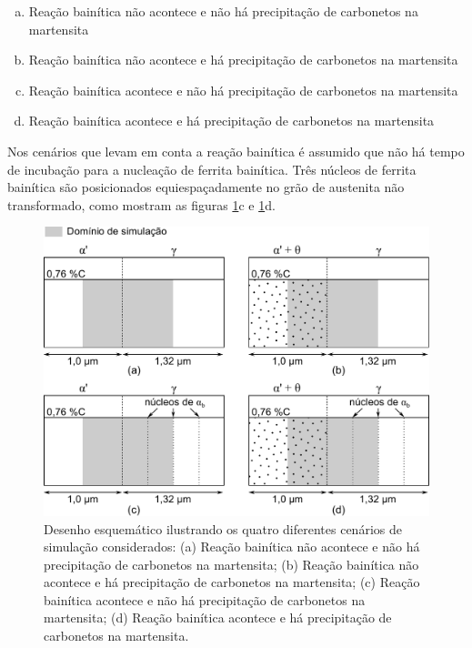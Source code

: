 \begin{enumerate}[(a)]
  \item Reação bainítica não acontece e não há precipitação de carbonetos na martensita
  \item Reação bainítica não acontece e há precipitação de carbonetos na martensita
  \item Reação bainítica acontece e não há precipitação de carbonetos na martensita
  \item Reação bainítica acontece e há precipitação de carbonetos na martensita
\end{enumerate}

Nos cenários que levam em conta a reação bainítica é assumido que não há tempo de incubação para a nucleação de ferrita bainítica. Três núcleos de ferrita bainítica são posicionados equiespaçadamente no grão de austenita não transformado, como mostram as figuras \ref{fig:esquema_simulacoes}c e \ref{fig:esquema_simulacoes}d.

\begin{figure}
  \includegraphics[width=.9\textwidth]{img/cpartition/scheme_simulations.pdf}
  \caption{Desenho esquemático ilustrando os quatro diferentes cenários de simulação considerados: (a) Reação bainítica não acontece e não há precipitação de carbonetos na martensita; (b) Reação bainítica não acontece e há precipitação de carbonetos na martensita; (c) Reação bainítica acontece e não há precipitação de carbonetos na martensita; (d) Reação bainítica acontece e há precipitação de carbonetos na martensita.}
  \label{fig:esquema_simulacoes}
\end{figure}

